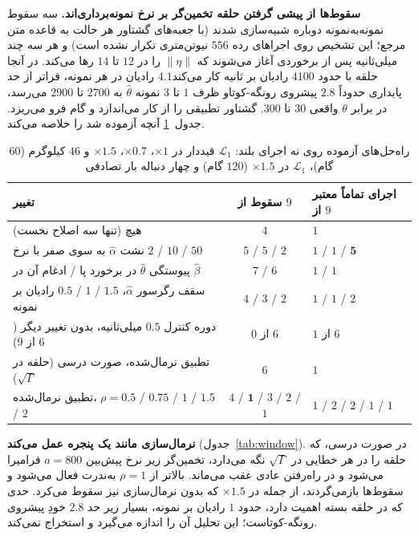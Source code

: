 \documentclass[10pt,twocolumn]{article}
\newcommand{\en}[1]{\lr{#1}}
\newcommand{\md}{\lr{\textemdash}}
\begin{document}
\textbf{سقوط‌ها از پیشی گرفتن حلقه تخمین‌گر بر نرخ نمونه‌برداری‌اند.} سه سقوط
نمونه‌به‌نمونه دوباره شبیه‌سازی شدند (با جعبه‌های گشتاور هر حالت به قاعده متن مرجع؛ این
تشخیص روی اجراهای رده $556$ نیوتن‌متری تکرار نشده است) و هر سه چند میلی‌ثانیه پس از
برخوردی آغاز می‌شوند که $\|\eta\|$ را در $12$ تا $14$ رها می‌کند. در آنجا حلقه با حدود $4100$ رادیان
بر ثانیه کار می‌کند\md{}$4.1$ رادیان در هر نمونه، فراتر از حد پایداری حدوداً $2.8$
پیشروی رونگه-کوتا\md{}و ظرف $1$ تا $3$ نمونه $\hat\theta$ به $2700$ تا $2900$ می‌رسد، در
برابر $\theta$ واقعی $30$ تا $300$. گشتاور تطبیقی \en{QP} را از کار می‌اندازد و گام
فرو می‌ریزد. جدول~\ref{tab:mitig} آنچه آزموده شد را خلاصه می‌کند.

\begin{table}[!t]
    \centering
    \caption{راه‌حل‌های آزموده روی نه اجرای بلند: $\mathcal{L}_1$ قیددار در $\times1$، $\times0.7$،
    $\times1.5$ و $46$ کیلوگرم ($60$ گام)، $\mathcal{L}_1$ در $\times1.5$ ($120$ گام) و چهار
    دنباله بار تصادفی}
    \label{tab:mitig}
    \small
    \begin{tabular}{p{}cp{}}
        \toprule
        تغییر & سقوط از $9$ & اجرای تماماً معتبر از $9$ \\
        \midrule
        هیچ (تنها سه اصلاح نخست) & $4$ & $1$ \\
        نشت $\hat\alpha$ به سوی صفر با نرخ $2$ / $10$ / $50$ & $5$ / $5$ / $2$ & $1$ / $1$ / $\mathbf{5}$ \\
        پیوستگی $\hat\theta$ در برخورد پا / ادغام آن در $\hat\beta$ & $7$ / $6$ & $1$ / $1$ \\
        سقف رگرسور $\hat\alpha$، $1.5$ / $1$ / $0.5$ رادیان بر نمونه & $4$ / $3$ / $2$ & $1$ / $1$ / $2$ \\
        دوره کنترل $0.5$ میلی‌ثانیه، بدون تغییر دیگر ($6$ از $9$) & $0$ از $6$ & $1$ از $6$ \\
        تطبیق نرمال‌شده، صورت درسی (حلقه در $\sqrt\Gamma$) & $6$ & $1$ \\
        تطبیق نرمال‌شده، $\rho=0.5$ / $0.75$ / $1$ / $1.5$ / $2$ & $4$ / $\mathbf{1}$ / $3$ / $2$ / $1$ & $1$ / $2$ / $2$ / $1$ / $1$ \\
        \bottomrule
    \end{tabular}
\end{table}

\textbf{نرمال‌سازی مانند یک پنجره عمل می‌کند} (جدول~\ref{tab:window}). در صورت درسی،
که حلقه را در هر خطایی در $\sqrt\Gamma$ نگه می‌دارد، تخمین‌گر زیر نرخ پیش‌بین
$a=800$ فرامیرا می‌شود و در راه‌رفتن عادی عقب می‌ماند. بالاتر از $\rho=1$ به‌ندرت فعال
می‌شود و سقوط‌ها بازمی‌گردند، از جمله در $\times1.5$ که بدون نرمال‌سازی نیز سقوط می‌کرد. حدی که در
حلقه بسته اهمیت دارد، حدود $1$ رادیان بر نمونه، بسیار زیر حد $2.8$ خودِ پیشروی
رونگه-کوتاست؛ این تحلیل آن را اندازه می‌گیرد و استخراج نمی‌کند.
\end{document}
